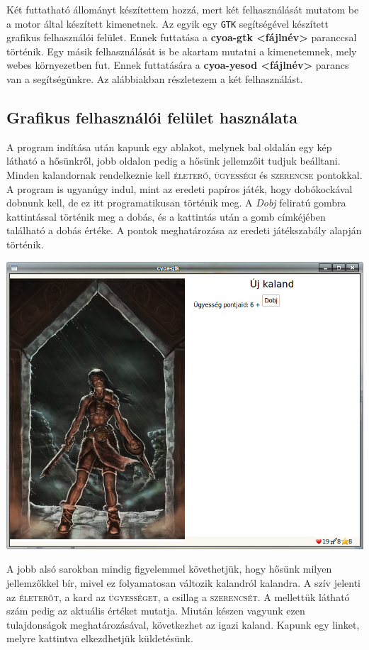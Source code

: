 \documentclass[12pt,a4paper,oneside]{report}
\newcommand{\stat}{\textsc}
\newcommand{\proglang}{\texttt}
\begin{document}
      Két futtatható állományt készítettem hozzá, mert két
      felhasználását mutatom be a motor által készített kimenetnek. Az
      egyik egy \proglang{GTK} segítségével készített grafikus felhasználói
      felület. Ennek futtatása a {\bf cyoa-gtk <fájlnév>} paranccsal
      történik. Egy másik felhasználását is be akartam mutatni a
      kimenetemnek, mely webes környezetben fut. Ennek futtatására
      a {\bf cyoa-yesod <fájlnév>} parancs van a segítségünkre. Az
      alábbiakban részletezem a két felhasználást.

      \subsection{Graf{}ikus felhasználói felület használata}
        A program indítása után kapunk egy ablakot, melynek bal
        oldalán egy kép látható a hősünkről, jobb oldalon pedig a
        hősünk jellemzőit tudjuk beálltani. Minden kalandornak
        rendelkeznie kell \stat{életerő}, \stat{ügyességi} és
        \stat{szerencse} pontokkal. A program is ugyanúgy indul, mint
        az eredeti papíros játék, hogy dobókockával dobnunk kell, de
        ez itt programatikusan történik meg. A \emph{Dobj} feliratú gombra
        kattintással történik meg a dobás, és a kattintás után a gomb
        címkéjében található a dobás értéke. A pontok meghatározása az
        eredeti játékszabály alapján történik.

        \includegraphics[scale=0.5]{screenshot_001.png}

        A jobb alsó sarokban mindig figyelemmel követhetjük, hogy
        hősünk milyen jellemzőkkel bír, mivel ez folyamatosan változik
        kalandról kalandra. A szív jelenti az \stat{életerőt}, a kard
        az \stat{ügyességet}, a csillag a \stat{szerencsét}. A
        mellettük látható szám pedig az aktuális értéket
        mutatja. Miután készen vagyunk ezen tulajdonságok
        meghatározásával, következhet az igazi kaland. Kapunk egy
        linket, melyre kattintva elkezdhetjük küldetésünk.
\end{document}
